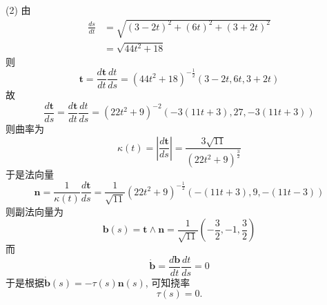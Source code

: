 \begin{tcolorbox}
	(2)
	由
	\begin{equation*}
		\begin{split}
			\frac{ds}{dt}
			&=\sqrt{(3-2t)^2+(6t)^2+(3+2t)^2} \\
			&=\sqrt{44t^2+18}
		\end{split}
	\end{equation*}
	则
	\begin{equation*}
		\boldsymbol{t}=\frac{d\boldsymbol{t}}{dt}\frac{dt}{ds}
		=(44t^2+18)^{-\frac{1}{2}}(3-2t,6t,3+2t)
	\end{equation*}
	故
	\begin{equation*}
		\frac{d\boldsymbol{t}}{ds}=\frac{d\boldsymbol{t}}{dt}\frac{dt}{ds}
		=(22t^2+9)^{-2}(-3(11t+3),27,-3(11t+3))
	\end{equation*}
	则曲率为
	\begin{equation*}
		\kappa(t)=|\frac{d\boldsymbol{t}}{ds}| = \frac{3\sqrt{11}}{(22t^2+9)^{\frac{3}{2}}}
	\end{equation*}
	于是法向量
	\begin{equation*}
		\boldsymbol{n}=\frac{1}{\kappa(t)}\frac{d\boldsymbol{t}}{ds}
		=\frac{1}{\sqrt{11}}(22t^2+9)^{-\frac{1}{2}}(-(11t+3),9,-(11t-3))
	\end{equation*}
	则副法向量为
	\begin{equation*}
		\boldsymbol{b}(s)=\boldsymbol{t}\wedge\boldsymbol{n}
		=\frac{1}{\sqrt{11}}(-\frac{3}{2},-1,\frac{3}{2})
	\end{equation*}
	而
	\begin{equation*}
		\dot{\boldsymbol{b}}=\frac{d\boldsymbol{b}}{dt}\frac{dt}{ds}=0
	\end{equation*}
	于是根据$\dot{\boldsymbol{b}}(s)=-\tau(s)\boldsymbol{n}(s)$,
	可知挠率
	\begin{equation*}
		\tau(s)=0.
	\end{equation*}
	

\end{tcolorbox}
